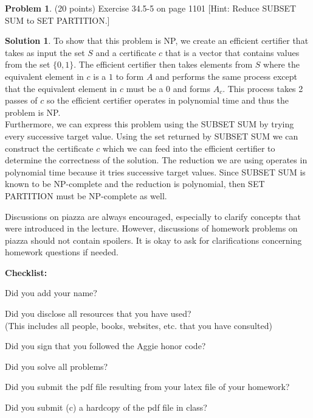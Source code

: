 \documentclass{article}
\theoremstyle{definition}
\newtheorem{problem}{Problem}
\newtheorem*{solution}{Solution}
\newcommand{\checklist}{\noindent\textbf{Checklist:}
\begin{compactitem}[$\Box$] 
\item Did you add your name? 
\item Did you disclose all resources that you have used? \\
(This includes all people, books, websites, etc. that you have consulted)
\item Did you sign that you followed the Aggie honor code? 
\item Did you solve all problems? 
\item Did you submit the pdf file resulting from your latex file 
  of your homework?
\item Did you submit (c) a hardcopy of the pdf file in class? 
\end{compactitem}
}
\begin{document}
\begin{problem} (20 points) %
Exercise 34.5-5 on page 1101 [Hint: Reduce SUBSET SUM
to SET PARTITION.] 
\end{problem}
\begin{solution}
To show that this problem is NP, we create an efficient certifier that takes as input the set $S$ and a certificate $c$ that is a vector that contains values from the set $\{0,1\}$. The efficient certifier then takes elements from $S$ where the equivalent element in $c$ is a $1$ to form $A$ and performs the same process except that the equivalent element in $c$ must be a 0 and forms $A_c$. This process takes 2 passes of $c$ so the efficient certifier operates in polynomial time and thus the problem is NP.\\
Furthermore, we can express this problem using the SUBSET SUM by trying every successive target value. Using the set returned by SUBSET SUM we can construct the certificate $c$ which we can feed into the efficient certifier to determine the correctness of the solution. The reduction we are using operates in polynomial time because it tries successive target values. Since SUBSET SUM is known to be NP-complete and the reduction is polynomial, then SET PARTITION must be NP-complete as well. 
\end{solution}

Discussions on piazza are always encouraged, especially to clarify
concepts that were introduced in the lecture. However, discussions of
homework problems on piazza should not contain spoilers. It is okay to
ask for clarifications concerning homework questions if needed. 
\medskip



\goodbreak
\checklist
\end{document}
